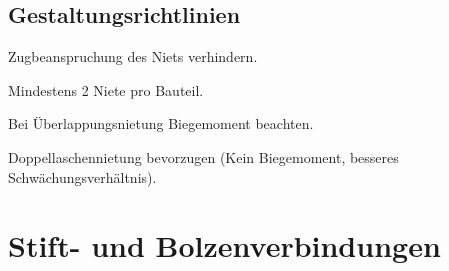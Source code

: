 	\subsection{Gestaltungsrichtlinien} %
		\begin{tightitemize}
			\item Zugbeanspruchung des Niets verhindern.
			\item Mindestens 2 Niete pro Bauteil.
			\item Bei Überlappungsnietung Biegemoment beachten.
			\item Doppellaschennietung bevorzugen (Kein Biegemoment, besseres Schwächungsverhältnis).
		\end{tightitemize}
\section{Stift- und Bolzenverbindungen} %
